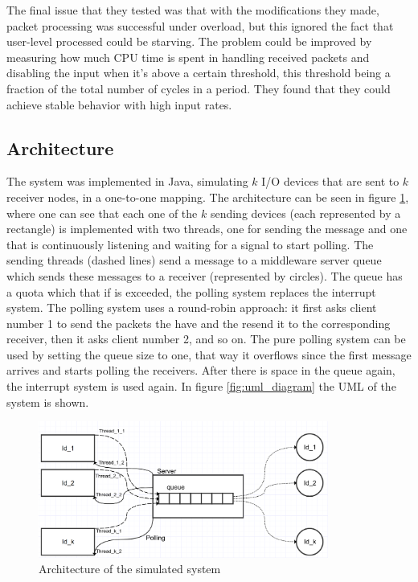 \documentclass{article}
\begin{document}
The final issue that they tested was that with the modifications they made, packet processing was successful under overload, but this ignored the fact that user-level processed could be starving. The problem could be improved by measuring how much CPU time is spent in handling received packets and disabling the input when it's above a certain threshold, this threshold being a fraction of the total number of cycles in a period. They found that they could achieve stable behavior with high input rates.

\subsection{Architecture}

The system was implemented in Java, simulating $k$ I/O devices that are sent to $k$ receiver nodes, in a one-to-one mapping. The architecture can be seen in figure \ref{fig:arch_diagram}, where one can see that each one of the $k$ sending devices (each represented by a rectangle) is implemented with two threads, one for sending the message and one that is continuously listening and waiting for a signal to start polling. The sending threads (dashed lines) send a message to a middleware server queue which sends these messages to a receiver (represented by circles). The queue has a quota which that if is exceeded, the polling system replaces the interrupt system. The polling system uses a round-robin approach: it first asks client number 1 to send the packets the have and the resend it to the corresponding receiver, then it asks client number 2, and so on. The pure polling system can be used by setting the queue size to one, that way it overflows since the first message arrives and starts polling the receivers. After there is space in the queue again, the interrupt system is used again. In figure \ref{fig:uml_diagram} the UML of the system is shown.



\begin{figure}[H]
    \centering
    \includegraphics[width=0.85\textwidth]{diagram.png}
    \caption{Architecture of the simulated system}
    \label{fig:arch_diagram}
\end{figure}
\end{document}
